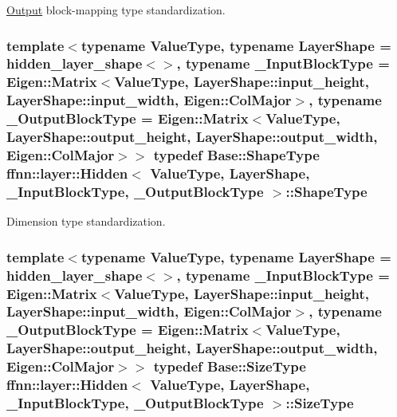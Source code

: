 \hyperlink{classffnn_1_1layer_1_1_output}{Output} block-\/mapping type standardization. 

\hypertarget{classffnn_1_1layer_1_1_hidden_abdfcf81b3846fae3b19a207424695df0}{
\subsubsection[{Shape\-Type}]{\setlength{\rightskip}{0pt plus 5cm}template$<$typename Value\-Type, typename Layer\-Shape = hidden\-\_\-layer\-\_\-shape$<$$>$, typename \-\_\-\-Input\-Block\-Type = Eigen\-::\-Matrix$<$\-Value\-Type, Layer\-Shape\-::input\-\_\-height,  Layer\-Shape\-::input\-\_\-width,  Eigen\-::\-Col\-Major$>$, typename \-\_\-\-Output\-Block\-Type = Eigen\-::\-Matrix$<$\-Value\-Type, Layer\-Shape\-::output\-\_\-height, Layer\-Shape\-::output\-\_\-width, Eigen\-::\-Col\-Major$>$$>$ typedef {\bf Base\-::\-Shape\-Type} {\bf ffnn\-::layer\-::\-Hidden}$<$ Value\-Type, Layer\-Shape, \-\_\-\-Input\-Block\-Type, \-\_\-\-Output\-Block\-Type $>$\-::{\bf Shape\-Type}}}\label{classffnn_1_1layer_1_1_hidden_abdfcf81b3846fae3b19a207424695df0}


Dimension type standardization. 

\hypertarget{classffnn_1_1layer_1_1_hidden_ac148012cb544a39841675601090cd4c8}{
\subsubsection[{Size\-Type}]{\setlength{\rightskip}{0pt plus 5cm}template$<$typename Value\-Type, typename Layer\-Shape = hidden\-\_\-layer\-\_\-shape$<$$>$, typename \-\_\-\-Input\-Block\-Type = Eigen\-::\-Matrix$<$\-Value\-Type, Layer\-Shape\-::input\-\_\-height,  Layer\-Shape\-::input\-\_\-width,  Eigen\-::\-Col\-Major$>$, typename \-\_\-\-Output\-Block\-Type = Eigen\-::\-Matrix$<$\-Value\-Type, Layer\-Shape\-::output\-\_\-height, Layer\-Shape\-::output\-\_\-width, Eigen\-::\-Col\-Major$>$$>$ typedef {\bf Base\-::\-Size\-Type} {\bf ffnn\-::layer\-::\-Hidden}$<$ Value\-Type, Layer\-Shape, \-\_\-\-Input\-Block\-Type, \-\_\-\-Output\-Block\-Type $>$\-::{\bf Size\-Type}}}\label{classffnn_1_1layer_1_1_hidden_ac148012cb544a39841675601090cd4c8}



